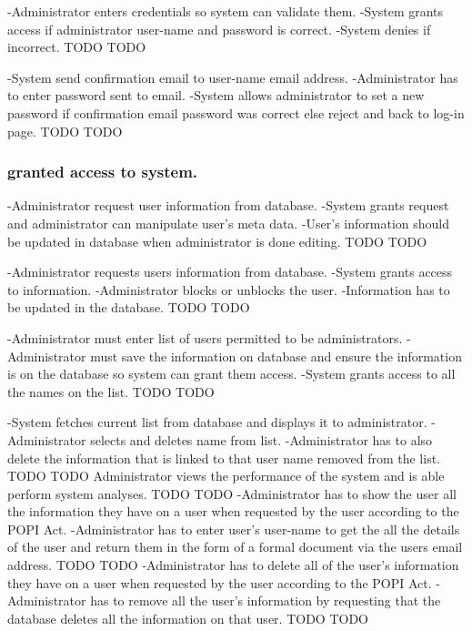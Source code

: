 	  	{-Administrator enters credentials so system can validate them.
	 	-System grants access if administrator user-name and password is correct.
	 	-System denies if incorrect.}
	 	{TODO}
        	{TODO}
	  
		
		{-System send confirmation email to user-name email address.
		-Administrator has to enter password sent to email.
	  	-System allows administrator to set a new password if confirmation email password was correct else reject and back to 			 log-in page.}
	  	{TODO}
		{TODO}
\subsubsection{granted access to system.}
 
		{-Administrator request user information from database.
		-System grants request and administrator can manipulate user's meta data.
		-User's information should be updated in database when administrator is done editing.}
		{TODO}
       		{TODO}
       
		{-Administrator requests users information from database.
		-System grants access to information.
		-Administrator blocks or unblocks the user.
		-Information has to be updated in the database.}
		{TODO}
        	{TODO}
		
		
		{-Administrator must enter list of users permitted to be administrators.
		-Administrator must save the information on database and ensure the information     		     			 		  is on the database so system can grant them access.
		-System grants access to all the names on the list.}
		{TODO}
        	{TODO}
		
		{-System fetches current list from database and displays it to administrator.
		-Administrator selects and deletes name from list.
		-Administrator has to also delete the information that is linked to that user 					 			 name removed from the list.}
		{TODO}
       	 	{TODO}
        {Administrator views the performance of the system and is able perform system analyses.}
        {TODO}
        {TODO}
	{-Administrator has to show the user all the information they have on a user when requested by the user according to the POPI 		 Act.
	-Administrator has to enter user's user-name to get the all the details of the user and return them in the form of a formal 		  document via the users email address.}
	{TODO}
	{TODO}
	{-Administrator has to delete all of the user's information they have on a user when requested by the user according to the POPI 	  Act.
	-Administrator has to remove all the user's information by requesting that the database deletes all the information on that 		 user.}
	{TODO}
	{TODO}

